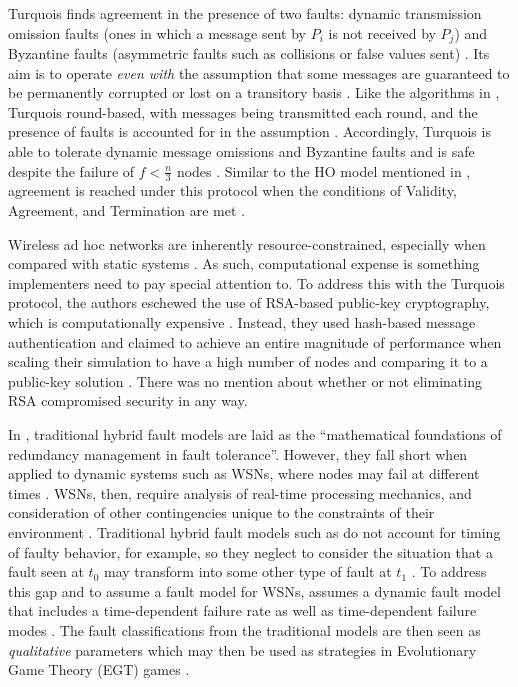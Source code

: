\documentclass[twoside, conference]{IEEEtran}
\begin{document}
Turquois finds agreement in the presence of two faults: dynamic transmission omission faults (ones in which a message sent by $P_i$ is not received by $P_j$) and Byzantine faults (asymmetric faults such as collisions or false values sent) \cite{Moniz2013}. Its aim is to operate \textit{even with} the assumption that some messages are guaranteed to be permanently corrupted or lost on a transitory basis \cite{Moniz2013}. Like the algorithms in \cite{bialy}, Turquois round-based, with messages being transmitted each round, and the presence of faults is accounted for in the assumption \cite{Moniz2013}. Accordingly, Turquois is able to tolerate dynamic message omissions and Byzantine faults and is safe despite the failure of $f < \frac{n}{3}$ nodes \cite{Moniz2013}. Similar to the HO model mentioned in \cite{bialy}, agreement is reached under this protocol when the conditions of Validity, Agreement, and Termination are met \cite{Moniz2013}.

Wireless ad hoc networks are inherently resource-constrained, especially when compared with static systems \cite{Moniz2013}. As such, computational expense is something implementers need to pay special attention to. To address this with the Turquois protocol, the authors eschewed the use of RSA-based public-key cryptography, which is computationally expensive \cite{Moniz2013}. Instead, they used hash-based message authentication and claimed to achieve an entire magnitude of performance when scaling their simulation to have a high number of nodes and comparing it to a public-key solution \cite{Moniz2013}. There was no mention about whether or not eliminating RSA compromised security in any way.

In \cite{Ma2008}, traditional hybrid fault models are laid as the ``mathematical foundations of redundancy management in fault tolerance''. However, they fall short when applied to dynamic systems such as WSNs, where nodes may fail at different times \cite{Ma2008}. WSNs, then, require analysis of real-time processing mechanics, and consideration of other contingencies unique to the constraints of their environment \cite{Ma2008}. Traditional hybrid fault models such as \cite{azad} do not account for timing of faulty behavior, for example, so they neglect to consider the situation that a fault seen at $t_0$ may transform into some other type of fault at $t_1$ \cite{Ma2008}. To address this gap and to assume a fault model for WSNs, \cite{Ma2008} assumes a dynamic fault model that includes a time-dependent failure rate as well as time-dependent failure modes \cite{Ma2008}. The fault classifications from the traditional models are then seen as \textit{qualitative} parameters which may then be used as strategies in Evolutionary Game Theory (EGT) games \cite{Ma2008}.
\end{document}
